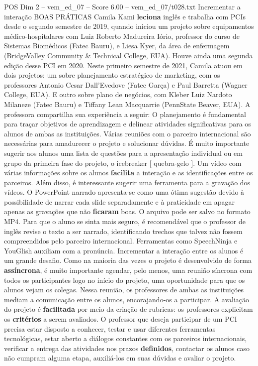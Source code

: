 \begin{textsample}{POS Dim 2 – vem\_ed\_07 – Score 6.00 – vem\_ed\_07/t028.txt}  \label{ex:f2_pos_158}
Incrementar a interação BOAS PRÁTICAS Camila Kami \textbf{leciona} inglês e trabalha com PCIs desde o segundo semestre de 2019, quando iniciou um projeto sobre equipamentos médico-hospitalares com Luiz Roberto Madureira Iório, professor do curso de Sistemas Biomédicos (Fatec Bauru), e Liesa Kyer, da área de enfermagem (BridgeValley Community \& Technical College, EUA).
Houve ainda uma segunda edição desse PCI em 2020.
Neste primeiro semestre de 2021, Camila atuou em dois projetos: um sobre planejamento estratégico de marketing, com os professores Antonio Cesar Dall’Evedove (Fatec Garça) e Paul Barretta (Wagner College, EUA).
E outro sobre plano de negócios, com Kleber Luiz Nardoto Milaneze (Fatec Bauru) e Tiffany Lean Macquarrie (PennState Beaver, EUA).
A professora compartilha sua experiência a seguir: O planejamento é fundamental para traçar objetivos de aprendizagem e delinear atividades significativas para os alunos de ambas as instituições.
Várias reuniões com o parceiro internacional são necessárias para amadurecer o projeto e solucionar dúvidas.
É muito importante sugerir aos alunos uma lista de questões para a apresentação individual ou em grupo da primeira fase do projeto, o icebreaker [ quebra-gelo ].
Um vídeo com várias informações sobre os alunos \textbf{facilita} a interação e as identificações entre os parceiros.
Além disso, é interessante sugerir uma ferramenta para a gravação dos vídeos.
O PowerPoint narrado apresenta-se como uma ótima sugestão devido à possibilidade de narrar cada slide separadamente e à praticidade em apagar apenas as gravações que não \textbf{ficaram} boas.
O arquivo pode ser salvo no formato MP4.
Para que o aluno se sinta mais seguro, é recomendável que o professor de inglês revise o texto a ser narrado, identificando trechos que talvez não fossem compreendidos pelo parceiro internacional.
Ferramentas como SpeechNinja e YouGlish auxiliam com a pronúncia.
Incrementar a interação entre os alunos é um grande desafio.
Como na maioria das vezes o projeto é desenvolvido de forma \textbf{assíncrona}, é muito importante agendar, pelo menos, uma reunião síncrona com todos os participantes logo no início do projeto, uma oportunidade para que os alunos vejam os colegas.
Nessa reunião, os professores de ambas as instituições mediam a comunicação entre os alunos, encorajando-os a participar.
A avaliação do projeto é \textbf{facilitada} por meio da criação de rubricas: os professores explicitam os \textbf{critérios} a serem avaliados.
O professor que deseja participar de um PCI precisa estar disposto a conhecer, testar e usar diferentes ferramentas tecnológicas, estar aberto a diálogos constantes com os parceiros internacionais, verificar a entrega das atividades nos prazos \textbf{definidos}, contactar os alunos caso não cumpram alguma etapa, auxiliá-los em suas dúvidas e avaliar o projeto.

\end{textsample}
